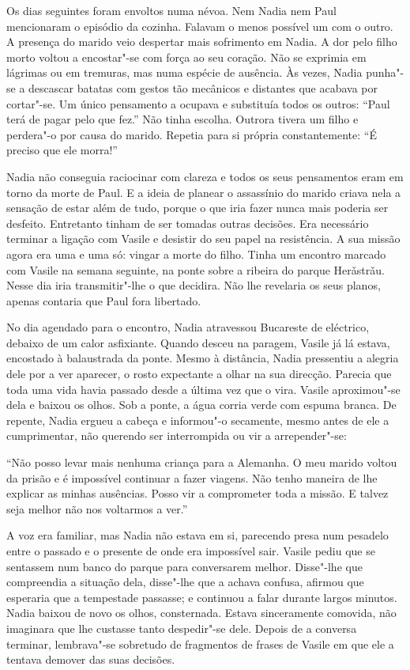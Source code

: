 Os dias seguintes foram envoltos numa névoa. Nem Nadia nem Paul
mencionaram o episódio da cozinha. Falavam o menos possível um com o
outro. A presença do marido veio despertar mais sofrimento em Nadia. A
dor pelo filho morto voltou a encostar"-se com força ao seu coração. Não
se exprimia em lágrimas ou em tremuras, mas numa espécie de ausência. Às
vezes, Nadia punha"-se a descascar batatas com gestos tão mecânicos e
distantes que acabava por cortar"-se. Um único pensamento a ocupava e
substituía todos os outros: ``Paul terá de pagar pelo que fez.'' Não tinha
escolha. Outrora tivera um filho e perdera"-o por causa do marido.
Repetia para si própria constantemente: ``É preciso que ele morra!''

Nadia não conseguia raciocinar com clareza e todos os seus pensamentos
eram em torno da morte de Paul. E a ideia de planear o assassínio do
marido criava nela a sensação de estar além de tudo, porque o que iria
fazer nunca mais poderia ser desfeito. Entretanto tinham de ser tomadas outras decisões. Era necessário terminar a ligação com Vasile e
desistir do seu papel na resistência. A sua missão agora era uma e uma
só: vingar a morte do filho. Tinha um encontro marcado com Vasile na
semana seguinte, na ponte sobre a ribeira do parque Herǎstrǎu. Nesse
dia iria transmitir"-lhe o que decidira. Não lhe revelaria os seus
planos, apenas contaria que Paul fora libertado.

No dia agendado para o encontro, Nadia atravessou Bucareste de
eléctrico, debaixo de um calor asfixiante. Quando desceu na paragem,
Vasile já lá estava, encostado à balaustrada da ponte. Mesmo à
distância, Nadia pressentiu a alegria dele por a ver aparecer, o rosto expectante a olhar na
sua direcção. Parecia que toda uma vida havia passado desde a última vez
que o vira. Vasile aproximou"-se dela e baixou os olhos. Sob a ponte, a
água corria verde com espuma branca. De repente, Nadia ergueu a cabeça e
informou"-o secamente, mesmo antes de ele a cumprimentar, não querendo
ser interrompida ou vir a arrepender"-se:

``Não posso levar mais nenhuma criança para a Alemanha. O meu marido
voltou da prisão e é impossível continuar a fazer viagens. Não tenho
maneira de lhe explicar as minhas ausências. Posso vir a comprometer
toda a missão. E talvez seja melhor não nos voltarmos a ver.''

A voz era familiar, mas Nadia não estava em si, parecendo presa num
pesadelo entre o passado e o presente de onde era impossível sair.
Vasile pediu que se sentassem num banco do parque para conversarem
melhor. Disse"-lhe que compreendia a situação dela, disse"-lhe que a
achava confusa, afirmou que esperaria que a tempestade passasse; e
continuou a falar durante largos minutos. Nadia baixou de novo os olhos,
consternada. Estava sinceramente comovida, não imaginara que lhe
custasse tanto despedir"-se dele. Depois de a conversa terminar,
lembrava"-se sobretudo de fragmentos de frases de Vasile em que ele a
tentava demover das suas decisões.

